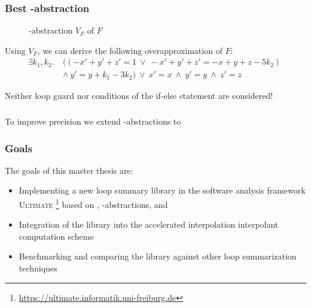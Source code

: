 \documentclass[%
10pt,
dvipsnames,
]{beamer}
\begin{document}
\begin{frame}[t]
	\frametitle{Best \qvasr-abstraction}
	\begin{center}
		\begin{figure}
		
		\caption*{\qvasr-abstraction $V_F$ of $F$}
		\end{figure}
	\end{center}
\pause
Using $V_F$, we can derive the following overapproximation of $F$:
	\begin{align*}
		\exists k_1, k_2.\ &((-x' + y' + z' = 1\ \lor\ -x' + y' + z' = -x + y + z - 5k_2)\ \\ &\land\ y' = y + k_1 - 3k_2)\ \lor\ x' = x\ \land\ y' = y\ \land\ z' = z
	\end{align*}
\pause
\vspace*{-0.5cm}
\begin{center}
\alert{Neither loop guard nor conditions of the if-else statement are considered!}
\end{center}
\end{frame}


\begin{frame}[t]
	\frametitle{\qvasrs}
	To improve precision we extend \qvasr-abstractions to 
\end{frame}


\begin{frame}[t]
	\frametitle{Goals}
	The goals of this master thesis are:
	\begin{itemize}
		\item Implementing a new loop summary library in the software analysis framework \textsc{Ultimate} \footnote{\url{https://ultimate.informatik.uni-freiburg.de}} based on \qvasr, \qvasr-abstractions, and \qvasrs
		\item Integration of the library into the accelerated interpolation interpolant computation scheme
		\item Benchmarking and comparing the library against other loop summarization techniques
	\end{itemize}
\end{frame}
\end{document}
